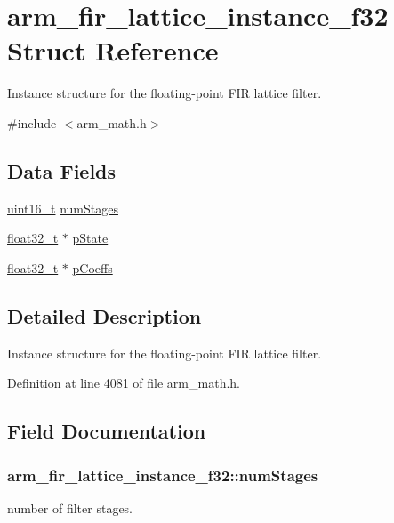 \hypertarget{structarm__fir__lattice__instance__f32}{\section{arm\-\_\-fir\-\_\-lattice\-\_\-instance\-\_\-f32 Struct Reference}
\label{structarm__fir__lattice__instance__f32}
}


Instance structure for the floating-\/point F\-I\-R lattice filter.  




{\ttfamily \#include $<$arm\-\_\-math.\-h$>$}

\subsection*{Data Fields}
\begin{DoxyCompactItemize}
\item 
\hyperlink{stdint_8h_a273cf69d639a59973b6019625df33e30}{uint16\-\_\-t} \hyperlink{structarm__fir__lattice__instance__f32_ad369bd9997a250f195254df37408a38f}{num\-Stages}
\item 
\hyperlink{arm__math_8h_a4611b605e45ab401f02cab15c5e38715}{float32\-\_\-t} $\ast$ \hyperlink{structarm__fir__lattice__instance__f32_ae348884a1ba9b83fadccd5da640cbcaf}{p\-State}
\item 
\hyperlink{arm__math_8h_a4611b605e45ab401f02cab15c5e38715}{float32\-\_\-t} $\ast$ \hyperlink{structarm__fir__lattice__instance__f32_a33bf5948c947f9ef80a99717cb0a0a43}{p\-Coeffs}
\end{DoxyCompactItemize}


\subsection{Detailed Description}
Instance structure for the floating-\/point F\-I\-R lattice filter. 

Definition at line 4081 of file arm\-\_\-math.\-h.



\subsection{Field Documentation}
\hypertarget{structarm__fir__lattice__instance__f32_ad369bd9997a250f195254df37408a38f}{
\subsubsection[{num\-Stages}]{ arm\-\_\-fir\-\_\-lattice\-\_\-instance\-\_\-f32\-::num\-Stages}}\label{structarm__fir__lattice__instance__f32_ad369bd9997a250f195254df37408a38f}
number of filter stages. 

